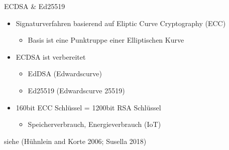 \documentclass[
  10pt,
  ignorenonframetext,
  aspectratio=43,
]{beamer}
\providecommand{\tightlist}{%
  \setlength{\itemsep}{0pt}\setlength{\parskip}{0pt}}
\begin{document}
\begin{frame}{ECDSA \& Ed25519}
\protect\hypertarget{ecdsa-ed25519}{}
\begin{itemize}
\tightlist
\item
  Signaturverfahren basierend auf Eliptic Curve Cryptography (ECC)

  \begin{itemize}
  \tightlist
  \item
    Basis ist eine Punktruppe einer Elliptischen Kurve
  \end{itemize}
\end{itemize}

\pause

\begin{itemize}
\item
  ECDSA ist verbereitet

  \pause

  \begin{itemize}
  \tightlist
  \item
    EdDSA (Edwardscurve)
  \end{itemize}

  \pause

  \begin{itemize}
  \tightlist
  \item
    Ed25519 (Edwardscurve 25519)
  \end{itemize}

  \pause
\item
  160bit ECC Schlüssel = 1200bit RSA Schlüssel

  \begin{itemize}
  \tightlist
  \item
    Speicherverbrauch, Energieverbrauch (IoT)
  \end{itemize}
\end{itemize}

siehe (Hühnlein and Korte 2006; Susella 2018)
\end{frame}
\end{document}
